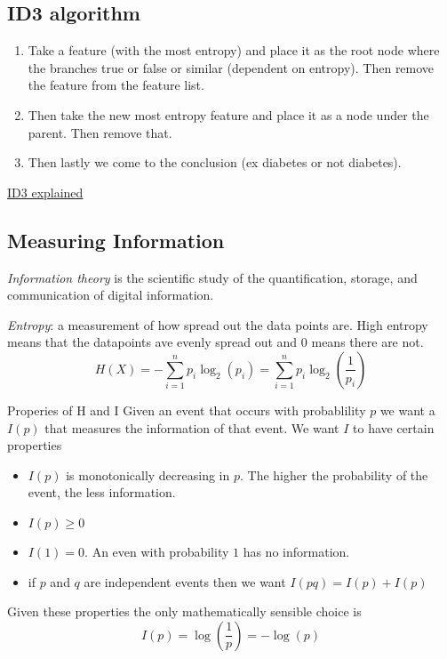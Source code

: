 \documentclass{article}
\begin{document}
\subsection{ID3 algorithm}
\begin{enumerate}
    \item Take a feature (with the most entropy) and place it as the root node where the branches true or false or similar (dependent on entropy). Then remove the feature from the feature list.
    \item Then take the new most entropy feature and place it as a node under the parent. Then remove that. 
    \item Then lastly we come to the conclusion (ex diabetes or not diabetes).
\end{enumerate}
\href{https://www.youtube.com/watch?v=aLsReomQ7AA}{ID3 explained}

\subsection{Measuring Information}
\textit{Information theory} is the scientific study of the quantification, 
storage, and communication of digital information.

\textit{Entropy}: a measurement of how spread out the data points are. High entropy means 
that the datapoints ave evenly spread out and 0 means there are not.
\begin{equation*}
    H(X) = -\sum_{i=1}^{n} p_i\log_2(p_i) = \sum_{i=1}^{n} p_i\log_2\left(\frac{1}{p_i}\right)
\end{equation*}

Properies of H and I
Given an event that occurs with probablility $p$ we want a $I(p)$ that measures the 
information of that event. We want $I$ to have certain properties
\begin{itemize}
    \item $I(p)$ is monotonically decreasing in $p$. The higher the probability of the 
    event, the less information.
    \item $I(p) \geq 0$
    \item $I(1) = 0$. An even with probability $1$ has no information.
    \item if $p$ and $q$ are independent events then we want $I(pq) = I(p) + I(p)$
\end{itemize}
Given these properties the only mathematically sensible choice is 
\begin{equation*}
    I(p) = \log\left(\frac{1}{p}\right) = -\log(p)
\end{equation*}
\end{document}
